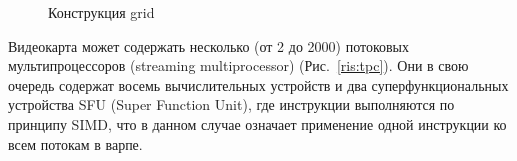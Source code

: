 \documentclass[a4paper,14pt,russian]{extreport}
\begin{document}
  \begin{figure}[h]
  \caption{Конструкция grid}
  \label{ris:thread_block}
  \end{figure}
\par Видеокарта может содержать несколько (от 2 до 2000) потоковых мультипроцессоров (streaming multiprocessor) (Рис.~\ref{ris:tpc}). Они в свою очередь содержат восемь вычислительных устройств и два суперфункциональных устройства SFU (Super Function Unit), где инструкции выполняются по принципу SIMD, что в данном случае означает применение одной инструкции ко всем потокам в варпе.
\par
\end{document}
